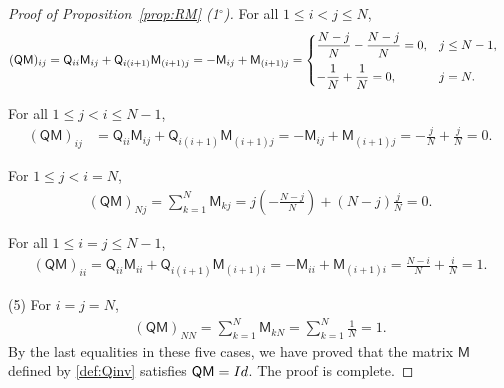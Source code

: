 \documentclass[10pt,a4paper]{amsart}
\newcommand{\cc}{{^\circ}}
\begin{document}
\begin{proof}[Proof of Proposition~\ref{prop:RM} (1$\cc$)]
 For all $1\leq i< j\leq N$,
\begin{align*}
(\mathsf Q\mathsf M)_{ij}&
=\mathsf Q_{ii}\mathsf M_{ij}+\mathsf Q_{i(i+1)}\mathsf M_{(i+1)j}
=-\mathsf M_{ij}+\mathsf M_{(i+1)j}
=
\begin{cases}
\displaystyle \frac{N-j}{N}-\frac{N-j}{N}=0,&j\leq N-1,\\
\vspace{-.3cm}\\
\displaystyle -\frac{1}{N}+\frac{1}{N}=0,&j=N.
\end{cases}
\end{align*}

 For all $1\leq j<i\leq N-1$,
\begin{align*}
(\mathsf Q\mathsf M)_{ij}&
=\mathsf Q_{ii}\mathsf M_{ij}+\mathsf Q_{i(i+1)}\mathsf M_{(i+1)j}=-\mathsf M_{ij}+\mathsf M_{(i+1)j}=-\frac{j}{N}+\frac{j}{N}=0.
\end{align*}

 For $1\leq j<i=N$,
\begin{align*}
(\mathsf Q\mathsf M)_{Nj}
=\sum_{k=1}^N\mathsf M_{kj}=j \left(-\frac{N-j}{N}\right)+(N-j)\frac{j}{N}=0.
\end{align*}

 For all $1\leq i=j\leq N-1$,
\begin{align*}
(\mathsf Q\mathsf M)_{ii}
=\mathsf Q_{ii}\mathsf M_{ii}+\mathsf Q_{i(i+1)}\mathsf M_{(i+1)i}=-\mathsf M_{ii}+\mathsf M_{(i+1)i}=\frac{N-i}{N}+\frac{i}{N}=1.
\end{align*}

\noindent (5) For $i=j=N$,
\begin{align*}
(\mathsf Q\mathsf M)_{NN}
=\sum_{k=1}^N\mathsf M_{kN}=\sum_{k=1}^N \frac{1}{N}=1.
\end{align*}
By the last equalities in these five cases,  we have proved that the matrix $\mathsf M$ defined by \eqref{def:Qinv} satisfies $\mathsf Q\mathsf M={\rm Id}$. The proof is complete.
\end{proof}
\end{document}
